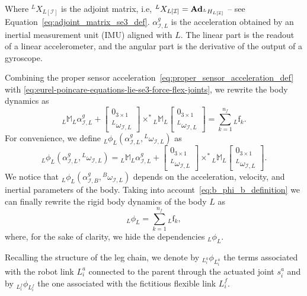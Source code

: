 Where ${}^L X_ {L[\mathcal{I}]}$ is the adjoint matrix, i.e, ${}^L X_ {L[\mathcal{I}]} = \operatorname{\mathbf{Ad}}_{{}^L H_ {L[\mathcal{I}]}}$ -- see Equation~\eqref{eq:adjoint_matrix_se3_def}. 
$\alpha _ {\mathcal{I},L}^g$ is the acceleration obtained by an inertial measurement unit (IMU) aligned with $L$. The linear part is the readout of a linear accelerometer, and the angular part is the derivative of the output of a gyroscope.
\par
Combining the proper sensor acceleration~\eqref{eq:proper_sensor_acceleration_def} with \eqref{eq:eurel-poincare-equations-lie-se3-force-flex-joints}, we rewrite the body dynamics as
\begin{equation}
    {} _ L \mathbb{M} _ L \alpha ^ g _ {\mathcal{I},L} + \begin{bmatrix} 
0 _ {3 \times 1} \\ 
{}^L \omega _{\mathcal{I}, L} \end{bmatrix}  \times ^ * {} _ L \mathbb{M} _ L \begin{bmatrix} 
0 _ {3 \times 1} \\ 
{}^L \omega _{\mathcal{I}, L} \end{bmatrix} =   \sum_{k=1}^{n_f} {} _ L \mathrm{f}_k.
\end{equation}
For convenience, we define ${}_L \phi_L\left(\alpha ^ g _ {\mathcal{I},L},{}^L \omega _{\mathcal{I}, L}\right) $ as
\begin{equation}
\label{eq:b_phi_b_definition}
    {}_L \phi_L\left(\alpha ^ g _ {\mathcal{I},L},{}^L \omega _{\mathcal{I}, L}\right)=  {} _ L \mathbb{M} _ L \alpha ^ g _ {\mathcal{I},L} + \begin{bmatrix} 
0 _ {3 \times 1} \\ 
{}^L \omega _{\mathcal{I}, L} \end{bmatrix}  \times ^ * {} _ L \mathbb{M} _ L \begin{bmatrix} 
0 _ {3 \times 1} \\ 
{}^L \omega _{\mathcal{I}, L} \end{bmatrix}.
\end{equation}
We notice that ${}_L \phi_L\left(\alpha ^ g _ {\mathcal{I},B},{}^B \omega _{\mathcal{I}, L}\right)$ depends on the acceleration, velocity, and inertial parameters of the body. Taking into account~\eqref{eq:b_phi_b_definition} we can finally rewrite the rigid body dynamics of the body $L$ as
\begin{equation}
\label{eq:rigid_body_dynamics_simplfied_final}
{}_L \phi_L =  \sum_{k=1}^{n_f} {} _ L \mathrm{f}_k,
\end{equation}
where, for the sake of clarity, we hide the dependencies ${}_L \phi_L$.
\par
Recalling the structure of the leg chain, we denote by ${}_{L^{a}_i} \phi_{L^{a}_i} $ the terms associated with the robot link ${L^{a}_i}$ connected to the parent through the actuated joint $s^a_i$ and by ${}_{{L^{f}_i}}  \phi_{{L^{f}_i}}$ the one associated with the fictitious flexible link ${L^{f}_i}$.



